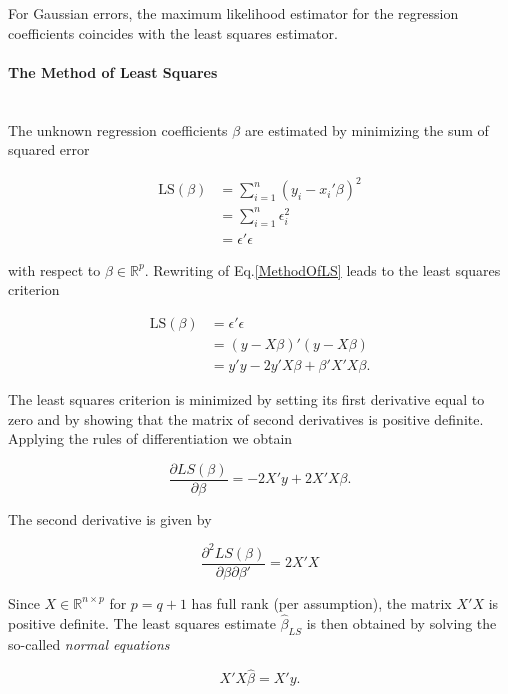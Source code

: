 \documentclass[10pt,a4paper]{article}
\newcommand{\subsubsubsection}[1]{\paragraph{#1}\mbox{}\\}
\begin{document}
For Gaussian errors, the maximum likelihood estimator for the regression coefficients coincides with the least squares estimator. 

\subsubsubsection{The Method of Least Squares}

The unknown regression coefficients $\beta$ are estimated by minimizing the sum of squared error

\begin{equation} \label{MethodOfLS} 
\begin{split} 
\text{LS}(\beta) &=  \sum_{i=1}^n(y_i - x_i'\beta)^2 \\ 
	&= \sum_{i=1}^n\epsilon_i^2  \\
	&= \epsilon'\epsilon
\end{split}
\end{equation}

with respect to $\beta \in \mathbb{R}^p$. Rewriting of Eq.\ref{MethodOfLS} leads to the least squares criterion

\begin{equation*}
\begin{split}
\text{LS}(\beta) &= \epsilon'\epsilon \\ 
				 &= (y - X\beta)'(y - X\beta) \\ 
				 &= y'y - 2y'X\beta + \beta'X'X\beta.
\end{split}
\end{equation*}

The least squares criterion is minimized by setting its first derivative equal to zero and by showing that the matrix of second derivatives is positive definite. Applying the rules of differentiation we obtain

\begin{equation*}
\frac{\partial LS(\beta)}{\partial \beta} = -2X' y + 2X'X\beta.
\end{equation*}

The second derivative is given by

\begin{equation*}
\frac{\partial^2LS(\beta)}{\partial\beta \partial \beta'} = 2X'X
\end{equation*}
	
Since $X \in \mathbb{R}^{n \times p}$ for $p = q + 1$ has full rank (per assumption), the matrix $X'X$ is positive definite. The least squares estimate $\hat \beta_{LS}$ is then obtained by solving the so-called \emph{normal equations}

\begin{equation} \label{NormalEquations}
X'X \hat \beta = X'y.
\end{equation}
\end{document}
